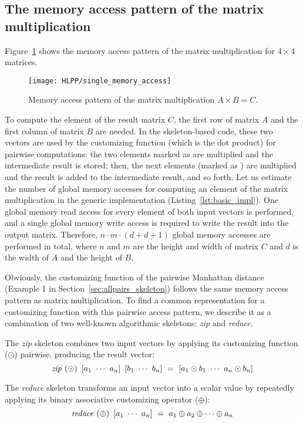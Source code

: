 \subsection{The memory access pattern of the matrix multiplication}
Figure~\ref{fig:single_memory_access} shows the memory access pattern of the matrix multiplication for $4\times 4$ matrices.
\begin{figure}[t]
  \centering
  \texttt{[image: HLPP/single\_memory\_access]}
  \caption{Memory access pattern of the matrix multiplication $A\times B = C$.}
  \label{fig:single_memory_access}
\end{figure}
To compute the element  of the result matrix $C$, the first row of matrix $A$ and the first column of matrix $B$ are needed.
In the skeleton-based code, these two vectors are used by the customizing function (which is the dot product) for pairwise computations:
the two elements marked as  are multiplied and the intermediate result is stored;
then, the next elements (marked as ) are multiplied and the result is added to the intermediate result, and so forth.
Let us estimate the number of global memory accesses for computing an element of the matrix multiplication in the generic implementation (Listing~\ref{lst:basic_impl}).
One global memory read access for every element of both input vectors is performed, and a single global memory write access is required to write the result into the output matrix.
Therefore, $n\cdot m\cdot (d + d + 1)$ global memory accesses are performed in total, where $n$ and $m$ are the height and width of matrix $C$ and $d$ is the width of $A$ and the height of $B$.

Obviously, the customizing function of the pairwise Manhattan distance (Example 1 in Section~\ref{sec:allpairs_skeleton}) follows the same memory access pattern as matrix multiplication.
To find a common representation for a customizing function with this pairwise access pattern, we describe it as a combination of two well-known algorithmic skeletons: \emph{zip} and \emph{reduce}.

The \emph{zip} skeleton combines two input vectors by applying its customizing function ($\odot$) pairwise, producing the result vector:
\[ \zip\ (\odot)\ \DottedVector{a_1}{a_n}\ \DottedVector{b_1}{b_n}\ =\ \DottedVector{a_1 \odot b_1}{a_n \odot b_n} \]

The \emph{reduce} skeleton transforms an input vector into a scalar value by repeatedly applying its binary associative customizing operator ($\oplus$):
\[ \reduce\ (\oplus)\ \DottedVector{a_1}{a_n}\ =\ a_1 \oplus a_2 \oplus \cdots \oplus a_n \]

